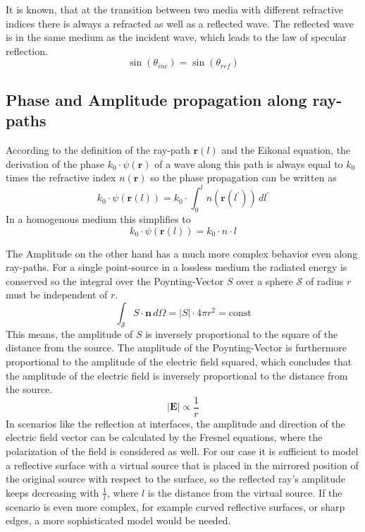 It is known, that at the transition between two media with different refractive indices there is always a refracted as well as a reflected wave.
The reflected wave is in the same medium as the incident wave, which leads to the law of specular reflection.
\begin{equation}
    \sin(\theta_{inc}) = \sin(\theta_{ref})
\end{equation}


\subsection{Phase and Amplitude propagation along ray-paths}
According to the definition of the ray-path \(\bm{r}(l)\) and the Eikonal equation, the derivation of the phase \(k_0 \cdot \psi(\bm{r})\) of a wave along this path is always equal to \(k_0\) times the refractive index \(n(\bm{r})\) so the phase propagation can be written as
\begin{equation}
    k_0 \cdot \psi(\bm{r}(l)) = k_0 \cdot \int_{0}^{l} n(\bm{r}(l^{\prime})) \, dl^{\prime}
\end{equation}
In a homogenous medium this simplifies to
\begin{equation}
    k_0 \cdot \psi(\bm{r}(l)) = k_0 \cdot n \cdot l
\end{equation}

The Amplitude on the other hand has a much more complex behavior even along ray-paths.
For a single point-source in a lossless medium the radiated energy is conserved so the integral over the Poynting-Vector \(S\) over a sphere \(\mathcal{S} \) of radius \(r\) must be independent of \(r\).
\begin{equation}
    \int_\mathcal{S}  S \cdot \bm{n} \, d\Omega = |S| \cdot 4\pi r^2 = \text{const}
\end{equation}
This means, the amplitude of \(S\) is inversely proportional to the square of the distance from the source.
The amplitude of the Poynting-Vector is furthermore proportional to the amplitude of the electric field squared, which concludes that the amplitude of the electric field is inversely proportional to the distance from the source.
\begin{equation}
    |\bm{E}| \propto \frac{1}{r}
\end{equation}
In scenarios like the reflection at interfaces, the amplitude and direction of the electric field vector can be calculated by the Fresnel equations, where the polarization of the field is considered as well.
For our case it is sufficient to model a reflective surface with a virtual source that is placed in the mirrored position of the original source with respect to the surface, so the reflected ray's amplitude keeps decreasing with \(\frac{1}{l}\), where \(l\) is the distance from the virtual source.
If the scenario is even more complex, for example curved reflective surfaces, or sharp edges, a more sophisticated model would be needed.

